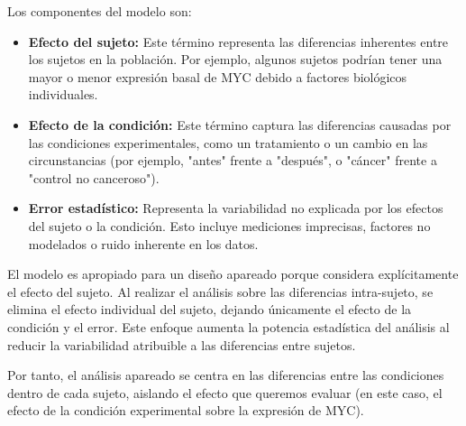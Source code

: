 \documentclass{config/apuntes}\usepackage[]{graphicx}\usepackage[]{xcolor}
\begin{document}
Los componentes del modelo son:
\begin{itemize}
\item \textbf{Efecto del sujeto:} Este término representa las diferencias inherentes entre los sujetos en la población. Por ejemplo, algunos sujetos podrían tener una mayor o menor expresión basal de MYC debido a factores biológicos individuales.
\item \textbf{Efecto de la condición:} Este término captura las diferencias causadas por las condiciones experimentales, como un tratamiento o un cambio en las circunstancias (por ejemplo, "antes" frente a "después", o "cáncer" frente a "control no canceroso").
\item \textbf{Error estadístico:}  Representa la variabilidad no explicada por los efectos del sujeto o la condición. Esto incluye mediciones imprecisas, factores no modelados o ruido inherente en los datos.
\end{itemize}

El modelo es apropiado para un diseño apareado porque considera explícitamente el efecto del sujeto. Al realizar el análisis sobre las diferencias intra-sujeto, se elimina el efecto individual del sujeto, dejando únicamente el efecto de la condición y el error. Este enfoque aumenta la potencia estadística del análisis al reducir la variabilidad atribuible a las diferencias entre sujetos.

Por tanto, el análisis apareado se centra en las diferencias entre las condiciones dentro de cada sujeto, aislando el efecto que queremos evaluar (en este caso, el efecto de la condición experimental sobre la expresión de MYC).
\end{document}

